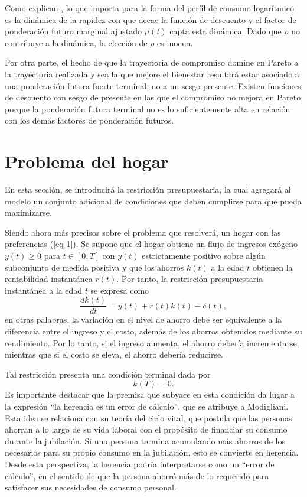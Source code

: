 Como explican \parencite{feigenbaum2021deviation}, lo que importa para la forma del perfil de consumo logarítmico es la dinámica de la rapidez con que decae la función de descuento y el factor de ponderación futuro marginal ajustado $\mu(t)$ capta esta dinámica. Dado que $\rho$ no contribuye a la dinámica, la elección de $\rho$ es inocua.
 
Por otra parte, el hecho de que la trayectoria de compromiso  domine en Pareto a la trayectoria realizada y sea la que mejore el bienestar resultará estar asociado a una ponderación futura fuerte terminal, no a un sesgo presente. Existen funciones de descuento con sesgo de presente en las que el compromiso no mejora en Pareto porque la ponderación futura terminal no es lo suficientemente alta en relación con los demás factores de ponderación futuros. 

\section{Problema del hogar}
En esta sección, se introducirá la restricción presupuestaria, la cual agregará al modelo un conjunto adicional de condiciones que deben cumplirse para que pueda maximizarse.

Siendo ahora más precisos sobre el problema que resolverá, un hogar con las preferencias (\ref{eq 1}). Se supone que el hogar obtiene un flujo de ingresos exógeno $y(t) \geq 0$ para $t \in [0, T]$ con $y(t)$ estrictamente positivo sobre algún subconjunto de medida positiva y que los ahorros $k(t)$ a la edad $t$ obtienen la rentabilidad instantánea $r(t)$. Por tanto, la restricción presupuestaria instantánea a la edad $t$ se expresa como
\begin{equation}
\label{eq 17}
\dfrac{dk(t)}{dt}= y(t)+r(t)k(t)-c(t),
\end{equation}
\noindent en otras palabras, la variación en el nivel de ahorro debe ser equivalente a la diferencia entre el ingreso y el costo, además de los ahorros obtenidos mediante su rendimiento. Por lo tanto, si el ingreso aumenta, el ahorro debería incrementarse, mientras que si el costo se eleva, el ahorro debería reducirse. 

Tal restricción presenta una condición terminal dada por
\begin{equation}
\label{eq 18}
    k(T)=0.
\end{equation}
Es importante destacar que la premisa que subyace en esta condición da lugar a la expresión “la herencia es un error de cálculo”, que se atribuye a Modigliani. Esta idea se relaciona con su teoría del ciclo vital, que postula que las personas ahorran a lo largo de su vida laboral con el propósito de financiar su consumo durante la jubilación. Si una persona termina acumulando más ahorros de los necesarios para su propio consumo en la jubilación, esto se convierte en herencia. Desde esta perspectiva, la herencia podría interpretarse como un “error de cálculo”, en el sentido de que la persona ahorró más de lo requerido para satisfacer sus necesidades de consumo personal.

